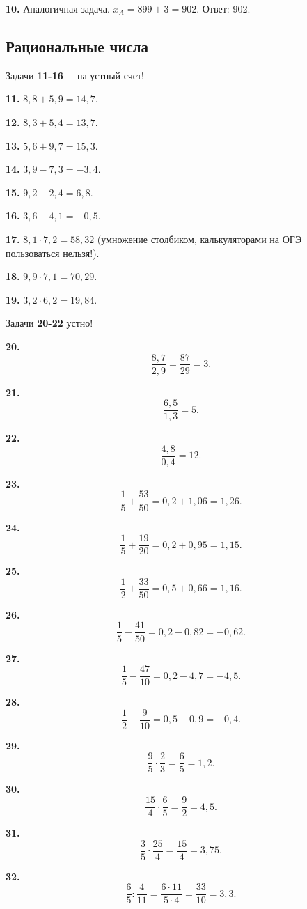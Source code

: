 \textbf{10.} Аналогичная задача. $x_A=899+3=902$. \newline \null \hspace*{\fill} Ответ: 902. 

\subsection{Рациональные числа}


Задачи \textbf{11-16} $-$ на устный счет!

\textbf{11.} $8,8+5,9=14,7.$

\textbf{12.} $8,3+5,4=13,7.$

\textbf{13.} $5,6+9,7=15,3.$

\textbf{14.} $3,9-7,3=-3,4.$

\textbf{15.} $9,2-2,4=6,8.$

\textbf{16.} $3,6-4,1= -0,5.$

\textbf{17.} $8,1\cdot7,2=58,32$ (умножение столбиком, калькуляторами на ОГЭ пользоваться нельзя!).

\textbf{18.} $9,9\cdot7,1=70,29.$

\textbf{19.} $3,2\cdot6,2=19,84.$

Задачи \textbf{20-22} устно!

\textbf{20.} $$\frac{8,7}{2,9}=\frac{87}{29}=3.$$

\null \textbf{21.} $$\frac{6,5}{1,3}=5.$$

\textbf{22.} $$\frac{4,8}{0,4}=12.$$

\textbf{23.} $$\frac{1}{5}+\frac{53}{50}=0,2+1,06=1,26.$$

\textbf{24.} $$\frac{1}{5}+\frac{19}{20}=0,2+0,95=1,15.$$

\newpage \textbf{25.} $$\frac{1}{2}+\frac{33}{50}=0,5+0,66=1,16.$$

\textbf{26.} $$\frac{1}{5}-\frac{41}{50}=0,2-0,82=-0,62.$$

\textbf{27.} $$\frac{1}{5}-\frac{47}{10}=0,2-4,7=-4,5.$$

\textbf{28.} $$\frac{1}{2}-\frac{9}{10}=0,5-0,9=-0,4.$$

\textbf{29.} $$\frac{9}{5}\cdot\frac{2}{3}=\frac{6}{5}=1,2.$$
 
\textbf{30.} $$\frac{15}{4}\cdot\frac{6}{5}=\frac{9}{2}=4,5.$$

\textbf{31.} $$\frac{3}{5}\cdot\frac{25}{4}=\frac{15}{4}=3,75.$$

\textbf{32.} $$\frac{6}{5}:\frac{4}{11}=\frac{6\cdot11}{5\cdot4}=\frac{33}{10}=3,3.$$

